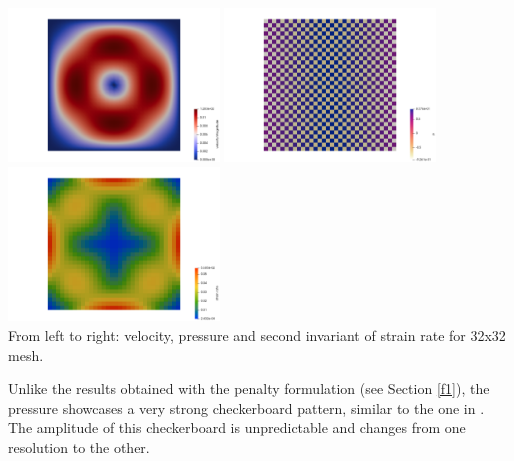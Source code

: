 \begin{center}
\includegraphics[width=5.6cm]{python_codes/fieldstone_14/results/dh/vel}
\includegraphics[width=5.6cm]{python_codes/fieldstone_14/results/dh/p}
\includegraphics[width=5.6cm]{python_codes/fieldstone_14/results/dh/sr}\\
{\captionfont From left to right: velocity, pressure and second invariant 
of strain rate for 32x32 mesh.}
\end{center}

Unlike the results obtained with the penalty formulation (see Section \ref{f1}),
the pressure showcases a very strong checkerboard pattern, similar to the one 
in \cite{dohu03}. The amplitude of this checkerboard is unpredictable 
and changes from one resolution to the other.

